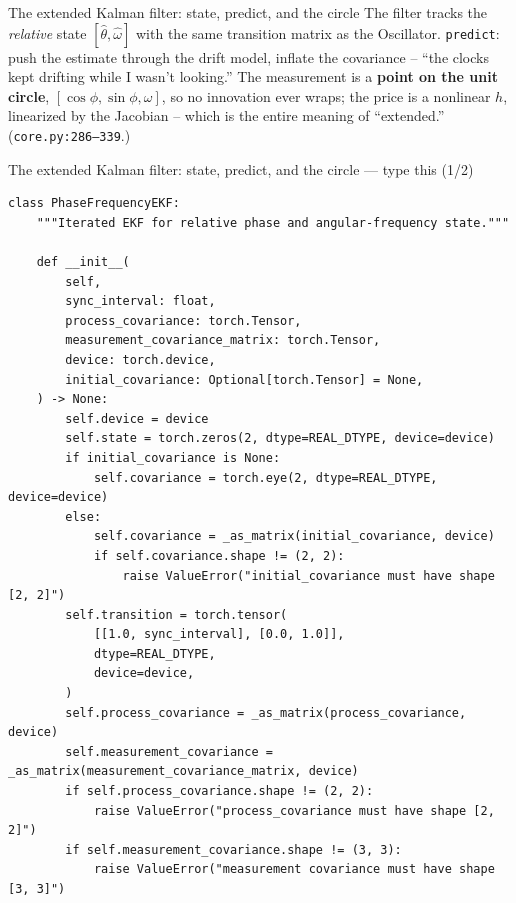 \documentclass[10pt]{beamer}
\begin{document}
\begin{frame}{The extended Kalman filter: state, predict, and the circle}
  The filter tracks the \emph{relative} state
  $[\hat\theta, \hat\omega]$ with the same transition matrix as
  the Oscillator. \texttt{predict}: push the estimate through
  the drift model, inflate the covariance -- ``the clocks kept
  drifting while I wasn't looking.'' The measurement is a
  \textbf{point on the unit circle}, $[\cos\phi, \sin\phi,
  \omega]$, so no innovation ever wraps; the price is a
  nonlinear $h$, linearized by the Jacobian -- which is the
  entire meaning of ``extended.'' (\texttt{core.py:286--339}.)
\end{frame}

\begin{frame}[fragile]{The extended Kalman filter: state, predict, and the circle --- type this (1/2)}
\begin{lstlisting}[basicstyle=\ttfamily\tiny]
class PhaseFrequencyEKF:
    """Iterated EKF for relative phase and angular-frequency state."""

    def __init__(
        self,
        sync_interval: float,
        process_covariance: torch.Tensor,
        measurement_covariance_matrix: torch.Tensor,
        device: torch.device,
        initial_covariance: Optional[torch.Tensor] = None,
    ) -> None:
        self.device = device
        self.state = torch.zeros(2, dtype=REAL_DTYPE, device=device)
        if initial_covariance is None:
            self.covariance = torch.eye(2, dtype=REAL_DTYPE, device=device)
        else:
            self.covariance = _as_matrix(initial_covariance, device)
            if self.covariance.shape != (2, 2):
                raise ValueError("initial_covariance must have shape [2, 2]")
        self.transition = torch.tensor(
            [[1.0, sync_interval], [0.0, 1.0]],
            dtype=REAL_DTYPE,
            device=device,
        )
        self.process_covariance = _as_matrix(process_covariance, device)
        self.measurement_covariance = _as_matrix(measurement_covariance_matrix, device)
        if self.process_covariance.shape != (2, 2):
            raise ValueError("process_covariance must have shape [2, 2]")
        if self.measurement_covariance.shape != (3, 3):
            raise ValueError("measurement covariance must have shape [3, 3]")
\end{lstlisting}
\end{frame}
\end{document}
